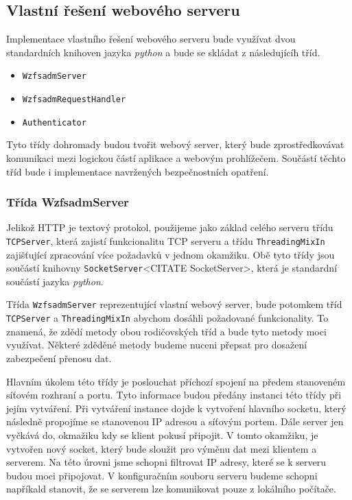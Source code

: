    \subsection{Vlastní řešení webového serveru}
    Implementace vlastního řešení webového serveru bude využívat dvou standardních knihoven jazyka \emph{python} a bude se skládat z následujícíh tříd.
    \begin{itemize}
      \item \verb|WzfsadmServer|
      \item \verb|WzfsadmRequestHandler|
      \item \verb|Authenticator|
    \end{itemize}

    Tyto třídy dohromady budou tvořit webový server, který bude zprostředkovávat komunikaci mezi logickou částí aplikace a webovým prohlížečem. Součástí těchto tříd bude i implementace navržených bezpečnostních opatření.
    \subsubsection{Třída WzfsadmServer}
    Jelikož HTTP je textový protokol, použijeme jako základ celého serveru  třídu \verb|TCPServer|, která zajistí funkcionalitu TCP serveru a třídu \verb|ThreadingMixIn| zajišťující zpracování více požadavků v jednom okamžiku. Obě tyto třídy jsou součástí knihovny \verb|SocketServer|<CITATE SocketServer>, která je standardní součástí jazyka \emph{python}.

    Třída \verb|WzfsadmServer| reprezentující vlastní webový server, bude potomkem tříd \verb|TCPServer| a \verb|ThreadingMixIn| abychom dosáhli požadované funkcionality. To znamená, že zdědí metody obou rodičovských tříd a bude tyto metody moci využívat. Některé zděděné metody budeme nuceni přepsat pro dosažení zabezpečení přenosu dat.

    Hlavním úkolem této třídy je poslouchat příchozí spojení na předem stanoveném síťovém rozhraní a portu. Tyto informace budou předány instanci této třídy při jejím vytváření. Při vytváření instance dojde k vytvoření hlavního socketu, který následně propojíme se stanovenou IP adresou a síťovým portem. Dále server jen vyčkává do, okmažiku kdy se klient pokusí připojit. V tomto okamžiku, je vytvořen nový socket, který bude sloužit pro výměnu dat mezi klientem a serverem. Na této úrovni jsme schopni filtrovat IP adresy, které se k serveru budou moci připojovat. V konfiguračním souboru serveru budeme schopni napříkald stanovit, že se serverem lze komunikovat pouze z lokálního počítače.

